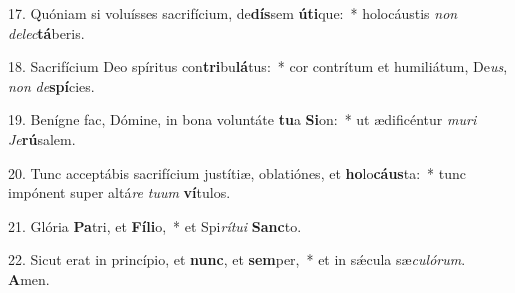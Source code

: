 17. Quóniam si voluísses sacrifícium, de\textbf{dís}sem \textbf{ú}\textbf{ti}que:~*  holocáustis \textit{non} \textit{de}\textit{lec}\textbf{tá}beris.\

18. Sacrifícium Deo spíritus con\textbf{tri}bu\textbf{lá}tus:~*  cor contrítum et humiliátum, De\textit{us}, \textit{non} \textit{de}\textbf{spí}cies.\

19. Benígne fac, Dómine, in bona voluntáte \textbf{tu}a \textbf{Si}on:~*  ut ædificéntur \textit{mu}\textit{ri} \textit{Je}\textbf{rú}salem.\

20. Tunc acceptábis sacrifícium justítiæ, oblatiónes, et \textbf{ho}lo\textbf{cáus}ta:~*  tunc impónent super altá\textit{re} \textit{tu}\textit{um} \textbf{ví}tulos.\

21. Glória \textbf{Pa}tri, et \textbf{Fí}\textbf{li}o,~*  et Spi\textit{rí}\textit{tu}\textit{i} \textbf{Sanc}to.\

22. Sicut erat in princípio, et \textbf{nunc}, et \textbf{sem}per,~*  et in sǽcula sæ\textit{cu}\textit{ló}\textit{rum}. \textbf{A}men.\

